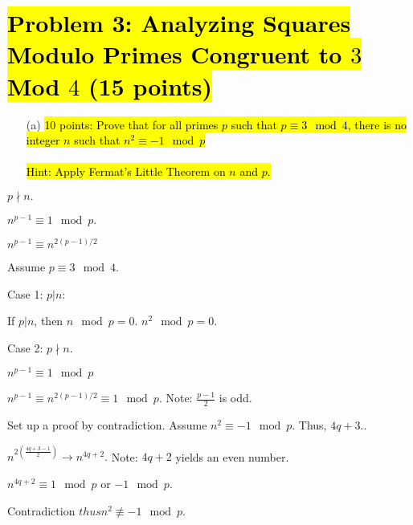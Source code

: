 \documentclass[12pt]{article}
\begin{document}
\section*{\hl{Problem 3: Analyzing Squares Modulo Primes Congruent to $3$ Mod $4$ (15 
points)}}
\begin{enumerate}
\item[(a)] \hl{10 points: Prove that for all primes $p$ such that $p \equiv 3 \mod 4$, 
there is no integer $n$ such that $n^2 \equiv -1 \mod p$\\
\\
Hint: Apply Fermat's Little Theorem on $n$ and $p$.}
\end{enumerate}
\item $p\nmid n. $
\item $n^{p-1} \equiv 1 \mod p.$
\item $n^{p-1} \equiv n^{2(p-1)/2}$
\item Assume $p \equiv 3 \mod 4.$
\item Case 1: $p|n:$
\item If $p|n$, then $ n \mod p = 0$. $n^{2} \mod p = 0.$
\item Case 2: $p\nmid n. $
\item $n^{p-1} \equiv 1 \mod p$
\item $n^{p-1} \equiv n^{2(p-1)/2} \equiv 1 \mod p.$ Note: $\frac{p-1}{2}$ is odd.
\item Set up a proof by contradiction. Assume $n^2 \equiv -1 \mod p$. Thus, $4q+3$..
\item $n^{2(\frac{4q+3-1}{2})} \rightarrow n^{4q+2}.$ Note: $4q+2$ yields an even number.
\item $n^{4q+2} \equiv 1 \mod p$ or $-1 \mod p$.
\item Contradiction \rightarrow $ thus  n^2 \not\equiv -1 \mod p$.
\end{document}

